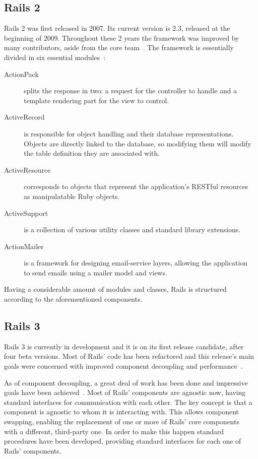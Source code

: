 \subsection{Rails 2}
\label{tech:sec:ruby_on_rails:rails2}
Rails 2 was first released in 2007. Its current version is 2.3, released at the beginning of 2009. Throughout these 2 years the framework was improved by many contributors, aside from the core team~\cite{rails_core_team}. The framework is essentially divided in six essential modules~\cite{ruby_on_rails_principles, rails23_release_notes}:
\begin{description}
\item[ActionPack] splits the response in two:  a request for the controller to handle and a template rendering part for the view to control.
\item[ActiveRecord] is responsible for object handling and their database representations. Objects are directly linked to the database, so modifying them will modify the table definition they are associated with.
\item[ActiveResource] corresponds to objects that represent the application's RESTful resources as manipulatable Ruby objects.
\item[ActiveSupport] is a collection of various utility classes and standard library extensions.
\item[ActionMailer] is a framework for designing email-service layers, allowing the application to send emails using a mailer model and views.
\end{description}
Having a considerable amount of modules and classes, Rails is structured according to the aforementioned components.


\subsection{Rails 3}
\label{tech:sec:ruby_on_rails:rails3}
Rails 3 is currently in development and it is on its first release candidate, after four beta versions. Most of Rails' code has been refactored and this release's main goals were concerned with improved component decoupling and performance~\cite{rails3_great_decoupling}. 

As of component decoupling, a great deal of work has been done and impressive goals have been achieved~\cite{vaporware_to_awesome}. Most of Rails' components are agnostic now, having standard interfaces for communication with each other. The key concept is that a component is agnostic to whom it is interacting with. This allows component swapping, enabling the replacement of one or more of Rails' core components with a different, third-party one. In order to make this happen standard procedures have been developed, providing standard interfaces for each one of Rails' components.

